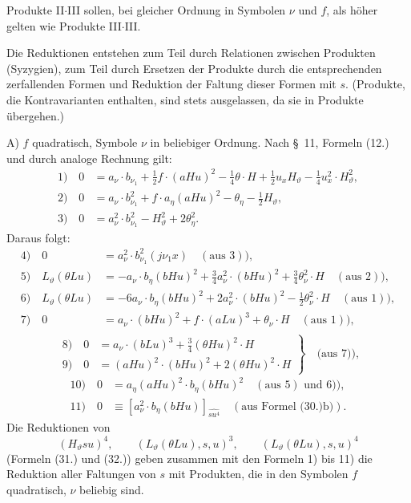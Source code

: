 Produkte II$\cdot$III sollen, bei gleicher Ordnung in Symbolen $\nu$ und $f$, als höher gelten wie Produkte III$\cdot$III.

Die Reduktionen entstehen zum Teil durch Relationen zwischen Produkten (Syzygien), zum Teil durch Ersetzen der Produkte durch die entsprechenden zerfallenden Formen und Reduktion der Faltung dieser Formen mit $s$. (Produkte, die Kontravarianten enthalten, sind stets ausgelassen, da sie in Produkte übergehen.)

A) $f$ quadratisch, Symbole $\nu$ in beliebiger Ordnung. Nach \S\ 11, Formeln (12.) und durch analoge Rechnung gilt:
\begin{align*}
1)\quad 0&=a_\nu\cdot b_{\nu_1}+\frac12f\cdot(aHu)^2-\frac14\theta\cdot H+\frac12u_xH_\vartheta-\frac14u_x^2\cdot H_\vartheta^2,\\
2)\quad 0&=a_\nu\cdot b_{\nu_1}^2+f\cdot a_\eta(aHu)^2-\theta_\eta-\frac12H_\vartheta,\\
3)\quad 0&=a_\nu^2\cdot b_{\nu_1}^2-H_\vartheta^2+2\theta_\eta^2.
\end{align*}
Daraus folgt:
\begin{align*}
4)\quad 0&=a_\nu^2\cdot b_{\nu_1}^2(j\nu_1x)\quad(\text{aus }3)),\\
5)\quad L_\vartheta(\theta Lu)&=-a_\nu\cdot b_\eta(bHu)^2+\frac34a_\nu^2\cdot(bHu)^2+\frac34\theta_\nu^2\cdot H\quad(\text{aus }2)),\\
6)\quad L_\vartheta(\theta Lu)&=-6a_\nu\cdot b_\eta(bHu)^2+2a_\nu^2\cdot(bHu)^2-\frac12\theta_\nu^2\cdot H\quad(\text{aus }1)),\\
7)\quad 0&=a_\nu\cdot(bHu)^2+f\cdot(aLu)^3+\theta_\nu\cdot H\quad(\text{aus }1)),\\
\end{align*}
\[
\left.
\begin{aligned}
8)\quad 0&=a_\nu\cdot(bLu)^3+\frac34(\theta Hu)^2\cdot H\\
9)\quad 0&=(aHu)^2\cdot(bHu)^2+2(\theta Hu)^2\cdot H
\end{aligned}
\right\}\quad\text{(aus 7)),}
\]
\begin{align*}
10)\quad 0&=a_\eta(aHu)^2\cdot b_\eta(bHu)^2\quad(\text{aus }5)\text{ und }6)),\\
11)\quad 0&\equiv [a_\nu^2\cdot b_\eta(bHu)]_{\widehat{su^4}}\quad(\text{aus Formel (30.)b)}).
\end{align*}
Die Reduktionen von
\[
(H_\vartheta su)^4,
\qquad (L_\vartheta(\theta Lu),s,u)^3,
\qquad (L_\vartheta(\theta Lu),s,u)^4
\]
(Formeln (31.) und (32.)) geben zusammen mit den Formeln 1) bis 11) die Reduktion aller Faltungen von $s$ mit Produkten, die in den Symbolen $f$ quadratisch, $\nu$ beliebig sind.

